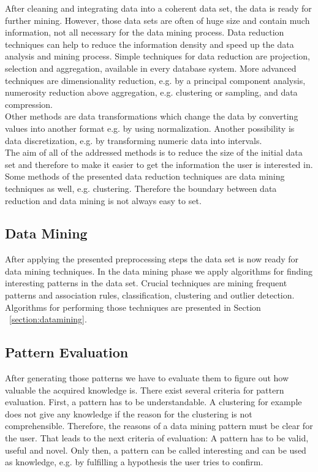 After cleaning and integrating data into a coherent data set, the data is ready for further mining. However, those data sets are often of huge size and contain much information, not all necessary for the data mining process. Data reduction techniques can help to reduce the information density and speed up the data analysis and mining process. Simple techniques for data reduction are projection, selection and aggregation, available in every database system. More advanced techniques are dimensionality reduction, e.g. by a principal component analysis, numerosity reduction above aggregation, e.g. clustering or sampling, and data compression. 
\\
Other methods are data transformations which change the data by converting values into another format e.g. by using normalization. Another possibility is data discretization, e.g. by transforming numeric data into intervals. 
\\
The aim of all of the addressed methods is to reduce the size of the initial data set and therefore to make it easier to get the information the user is interested in. Some methods of the presented data reduction techniques are data mining techniques as well, e.g. clustering. Therefore the boundary between data reduction and data mining is not always easy to set.


\subsection{Data Mining}

After applying the presented preprocessing steps the data set is now ready for data mining techniques. In the data mining phase we apply algorithms for finding interesting patterns in the data set. Crucial techniques are mining frequent patterns and association rules, classification, clustering and outlier detection. Algorithms for performing those techniques are presented in Section ~\ref{section:datamining}. 


\subsection{Pattern Evaluation}

After generating those patterns we have to evaluate them to figure out how valuable the acquired knowledge is. There exist several criteria for pattern evaluation. First, a pattern has to be understandable. A clustering for example does not give any knowledge if the reason for the clustering is not comprehensible. Therefore, the reasons of a data mining pattern must be clear for the user. That leads to the next criteria of evaluation: A pattern has to be valid, useful and novel. Only then, a pattern can be called interesting and can be used as knowledge, e.g. by fulfilling a hypothesis the user tries to confirm. 


